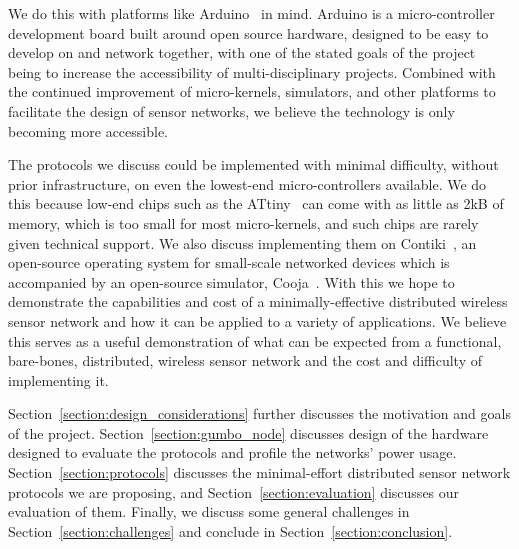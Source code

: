 We do this with platforms like Arduino~\cite{arduino} in mind.  Arduino is a micro-controller development board built
around open source hardware, designed to be easy to develop on and network together, with one of the stated goals of
the project being to increase the accessibility of multi-disciplinary projects.  Combined with the continued improvement
of micro-kernels, simulators, and other platforms to facilitate the design of sensor networks, we believe the technology
is only becoming more accessible.

The protocols we discuss could be implemented with minimal difficulty, without prior infrastructure, on even the lowest-end
micro-controllers available.  We do this because low-end chips such as the ATtiny~\cite{attinyds} can come with as little as
2kB of memory, which is too small for most micro-kernels, and such chips are rarely given technical support.  We also discuss
implementing them on Contiki~\cite{contiki},
an open-source operating system for small-scale networked devices which is accompanied by an open-source simulator,
Cooja~\cite{cooja}.  With this we hope to demonstrate the capabilities and cost of a minimally-effective distributed
wireless sensor network and how it can be applied to a variety of applications.  We believe this serves as a useful demonstration
of what can be expected from a functional, bare-bones, distributed, wireless sensor network and the cost and
difficulty of implementing it.

Section~\ref{section:design_considerations} further discusses the motivation and goals of the project.
Section~\ref{section:gumbo_node} discusses design of the hardware designed to evaluate the protocols and profile the networks'
power usage.  Section~\ref{section:protocols} discusses the minimal-effort distributed sensor network protocols we are
proposing, and Section~\ref{section:evaluation} discusses our evaluation of them.  Finally, we discuss some general challenges
in Section~\ref{section:challenges} and conclude in Section~\ref{section:conclusion}.

